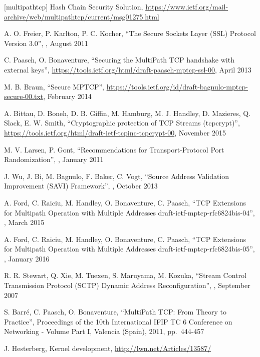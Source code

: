 \begin{thebibliography}{99}
[multipathtcp] Hash Chain Security Solution, 
\url{https://www.ietf.org/mail-archive/web/multipathtcp/current/msg01275.html}

A. O. Freier, P. Karlton, P. C. Kocher,
``The Secure Sockets Layer (SSL) Protocol Version 3.0'',
,  August 2011

C. Paasch, O. Bonaventure,
``Securing the MultiPath TCP handshake with external keys'',
\url{https://tools.ietf.org/html/draft-paasch-mptcp-ssl-00}, 
April 2013

M. B. Braun,
``Secure MPTCP'',
\url{https://tools.ietf.org/id/draft-bagnulo-mptcp-secure-00.txt}, 
February 2014

A. Bittau, D. Boneh, D. B. Giffin, M. Hamburg, M. J. Handley, D. Mazieres, Q. Slack, E. W. Smith,
``Cryptographic protection of TCP Streams (tcpcrypt)'',
\url{https://tools.ietf.org/html/draft-ietf-tcpinc-tcpcrypt-00}, 
November 2015

M. V. Larsen, P. Gont,
``Recommendations for Transport-Protocol Port Randomization'',
,  January 2011

J. Wu, J. Bi, M. Bagnulo, F. Baker, C. Vogt,
``Source Address Validation Improvement (SAVI) Framework'',
,  October 2013

A. Ford, C. Raiciu, M. Handley, O. Bonaventure, C. Paasch,
``TCP Extensions for Multipath Operation with Multiple Addresses draft-ietf-mptcp-rfc6824bis-04'',
,  March 2015

A. Ford, C. Raiciu, M. Handley, O. Bonaventure, C. Paasch,
``TCP Extensions for Multipath Operation with Multiple Addresses draft-ietf-mptcp-rfc6824bis-05'',
,  January 2016

R. R. Stewart, Q. Xie, M. Tuexen, S. Maruyama, M. Kozuka,
``Stream Control Transmission Protocol (SCTP) Dynamic Address Reconfiguration'',
,  September 2007

S. Barr{\'e}, C. Paasch, O. Bonaventure, 
``MultiPath TCP: From Theory to Practice'',
Proceedings of the 10th International IFIP TC 6 Conference on Networking - Volume Part I,
Valencia (Spain), 2011, 
pp.\ 444-457

J. Hesterberg, Kernel development,
\url{http://lwn.net/Articles/13587/}


\end{thebibliography}
